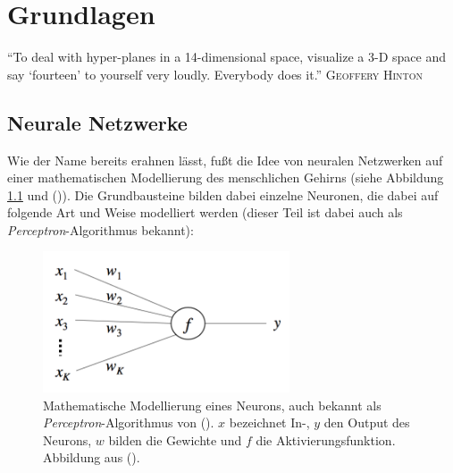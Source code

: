 
\chapter{Grundlagen} %

\label{Chapter3} %


\begin{itquote}
``To deal with hyper-planes in a 14-dimensional space, visualize a 3-D space and say `fourteen' to yourself
very loudly. Everybody does it.''
\flushright
\textsc{Geoffery Hinton}
\end{itquote}

\section{Neurale Netzwerke}

Wie der Name bereits erahnen lässt, fußt die Idee von neuralen Netzwerken auf einer mathematischen Modellierung
des menschlichen Gehirns (siehe Abbildung \ref{fig:perceptron} und (\cite{rosenblatt1958perceptron})). Die Grundbausteine bilden dabei einzelne Neuronen, die dabei auf folgende Art und Weise
modelliert werden (dieser Teil ist dabei auch als \emph{Perceptron}-Algorithmus bekannt):

\begin{figure}[h]
  \centering
  \includegraphics[width=0.65\textwidth]{../img/neuron.png}
  \caption[Mathematische Modellierung eines Neurons]{Mathematische Modellierung eines Neurons, auch bekannt als
  \emph{Perceptron}-Algorithmus von (\cite{rosenblatt1958perceptron}). $x$ bezeichnet In-, $y$ den Output des Neurons, $w$ bilden die Gewichte und $f$ die
  Aktivierungsfunktion. Abbildung aus (\cite{rong2014word2vec}).\label{fig:perceptron}}
\end{figure}

